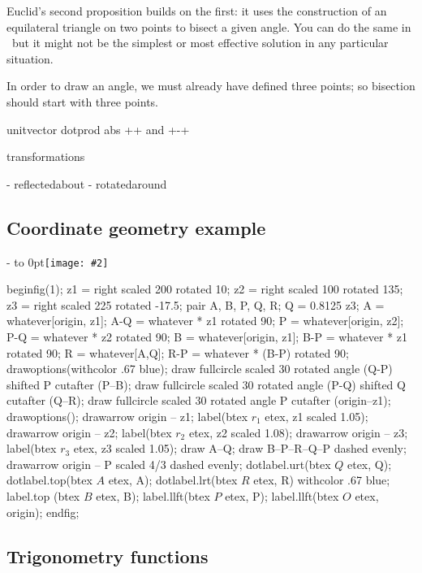 \documentclass[a4paper,landscape]{article}
\def\vpic#1#2{\moveright5.5in\vbox to 0pt{\vskip#1\texttt{[image: \#2]}\vss}}
\begin{document}
Euclid's second proposition builds on the first: it uses the construction of an
equilateral triangle on two points to bisect a given angle.  You can do the same 
in \MP\ but it might not be the simplest or most effective solution in any
particular situation.


In order to
draw an angle, we must already have defined three points; so bisection should start
with three points.



unitvector
dotprod
abs
++ and +-+


transformations

- reflectedabout
- rotatedaround


\newpage
\subsection{Coordinate geometry example}

\kern-\baselineskip
\vpic{1in}{projections1}
\begin{code}
beginfig(1);
z1 = right scaled 200 rotated 10;
z2 = right scaled 100 rotated 135;
z3 = right scaled 225 rotated -17.5;
pair A, B, P, Q, R;
Q = 0.8125 z3;
A = whatever[origin, z1]; A-Q = whatever * z1 rotated 90;
P = whatever[origin, z2]; P-Q = whatever * z2 rotated 90;
B = whatever[origin, z1]; B-P = whatever * z1 rotated 90;
R = whatever[A,Q];        R-P = whatever * (B-P) rotated 90;
drawoptions(withcolor .67 blue);
draw fullcircle scaled 30 rotated angle (Q-P) shifted P cutafter (P--B);
draw fullcircle scaled 30 rotated angle (P-Q) shifted Q cutafter (Q--R);
draw fullcircle scaled 30 rotated angle P               cutafter (origin--z1);
drawoptions();
drawarrow origin -- z1; label(btex $r_1$ etex, z1 scaled 1.05);
drawarrow origin -- z2; label(btex $r_2$ etex, z2 scaled 1.08);
drawarrow origin -- z3; label(btex $r_3$ etex, z3 scaled 1.05);
draw A--Q;
draw B--P--R--Q--P dashed evenly;
drawarrow origin -- P scaled 4/3 dashed evenly;
dotlabel.urt(btex $Q$ etex, Q);
dotlabel.top(btex $A$ etex, A);
dotlabel.lrt(btex $R$ etex, R) withcolor .67 blue;
label.top (btex $B$ etex, B);
label.llft(btex $P$ etex, P);
label.llft(btex $O$ etex, origin);
endfig;
\end{code}

\newpage
\subsection{Trigonometry functions}\label{trig}
\end{document}
